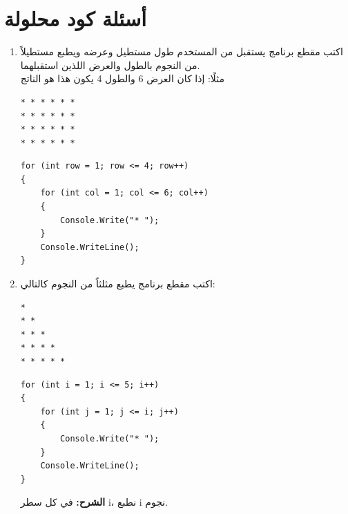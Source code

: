 \documentclass[14pt]{extarticle}
\begin{document}

\clearpage
\section{أسئلة كود محلولة}
\begin{enumerate}[itemsep=2em]
    \item
    اكتب مقطع برنامج يستقبل من المستخدم طول مستطيل وعرضه ويطبع مستطيلاً من النجوم بالطول والعرض اللذين استقبلهما. \\
    مثلًا: إذا كان العرض 6 والطول 4 يكون هذا هو الناتج \\
    \begin{english}
    \begin{boxCode}
\begin{verbatim}
* * * * * *
* * * * * *
* * * * * *
* * * * * *
    \end{verbatim}
\end{boxCode}
    \end{english}
    \ifwithsols
    \begin{boxSolution}
    \begin{english}
    \begin{verbatim}
for (int row = 1; row <= 4; row++)
{
    for (int col = 1; col <= 6; col++)
    {
        Console.Write("* ");
    }
    Console.WriteLine();
}
    \end{verbatim}
    \end{english}
    \end{boxSolution}
    \clearpage
    \fi

    \item
    اكتب مقطع برنامج يطبع مثلثاً من النجوم كالتالي:
    \begin{english}
    \begin{boxCode}
\begin{verbatim}
*
* *
* * *
* * * *
* * * * *
    \end{verbatim}
\end{boxCode}
    \end{english}
    \ifwithsols
    \begin{boxSolution}
    \begin{english}
    \begin{verbatim}
for (int i = 1; i <= 5; i++)
{
    for (int j = 1; j <= i; j++)
    {
        Console.Write("* ");
    }
    Console.WriteLine();
}
    \end{verbatim}
    \end{english}
    \textbf{الشرح:} في كل سطر \textenglish{i}، نطبع \textenglish{i} نجوم.
    \end{boxSolution}
    \clearpage
    \fi


\end{enumerate}
\end{document}
